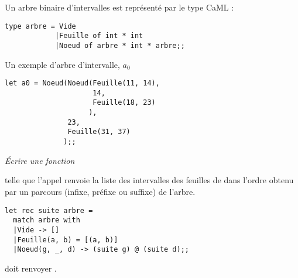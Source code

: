Un arbre binaire d'intervalles est représenté par le type CaML :
\begin{lstlisting}
type arbre = Vide
            |Feuille of int * int
            |Noeud of arbre * int * arbre;;
\end{lstlisting}
\medskip
\begin{minipage}{0.40\textwidth}
  \begin{center}

\medskip

Un exemple d'arbre d'intervalle, $a_0$
  \end{center}
\end{minipage}
\begin{minipage}{0.60\textwidth}
\begin{lstlisting}
let a0 = Noeud(Noeud(Feuille(11, 14), 
                     14, 
                     Feuille(18, 23)
                    ), 
               23,
               Feuille(31, 37)
              );;               
\end{lstlisting}
\end{minipage}
\begin{Exercise}\it
Écrire une fonction 

telle que l'appel  renvoie la liste des intervalles des feuilles de  dans l'ordre obtenu par un parcours (infixe, préfixe ou suffixe) de l'arbre.
\end{Exercise}
\begin{Answer}
\begin{lstlisting}
let rec suite arbre = 
  match arbre with
  |Vide -> []
  |Feuille(a, b) = [(a, b)]
  |Noeud(g, _, d) -> (suite g) @ (suite d);;
\end{lstlisting}
\end{Answer}
\smallskip
{} doit renvoyer \type{[(11, 14); (18, 23); (31, 37)]}.
\medskip

